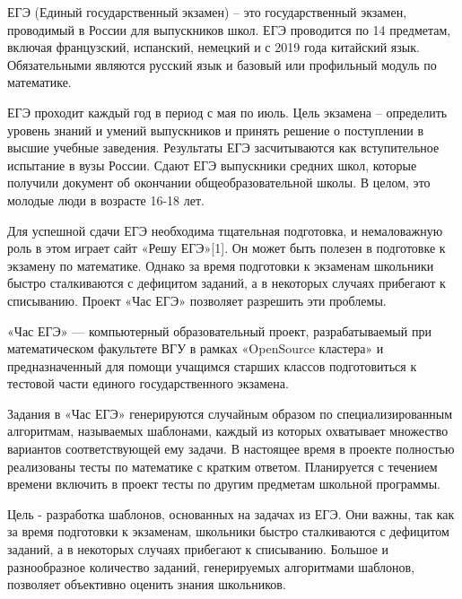 \quad ЕГЭ (Единый государственный экзамен) – это государственный экзамен, проводимый в России для выпускников школ. ЕГЭ проводится по 14 предметам, включая французский, испанский, немецкий и с 2019 года китайский язык. Обязательными являются русский язык и базовый или профильный модуль по математике.

\quad ЕГЭ проходит каждый год в период с мая по июль. Цель экзамена – определить уровень знаний и умений выпускников и принять решение о поступлении в высшие учебные заведения. Результаты ЕГЭ засчитываются как вступительное испытание в вузы России. Сдают ЕГЭ выпускники средних школ, которые получили документ об окончании общеобразовательной школы. В целом, это молодые люди в возрасте 16-18 лет.

\quad Для успешной сдачи ЕГЭ необходима тщательная подготовка, и немаловажную роль в этом играет сайт «Решу ЕГЭ»[1]. Он может быть полезен в подготовке к экзамену по математике.
Однако за время подготовки к экзаменам школьники быстро сталкиваются с дефицитом заданий, а в некоторых случаях прибегают к списыванию. Проект «Час ЕГЭ» позволяет разрешить эти проблемы. 

\quad «Час ЕГЭ» — компьютерный образовательный проект, разрабатываемый при математическом факультете ВГУ в рамках «OpenSource кластера» и предназначенный для помощи учащимся старших классов подготовиться к тестовой части единого государственного экзамена.

\quad Задания в «Час ЕГЭ» генерируются случайным образом по специализированным алгоритмам, называемых шаблонами, каждый из которых охватывает множество вариантов соответствующей ему задачи. В настоящее время в проекте полностью реализованы тесты по математике с кратким ответом. Планируется с течением времени включить в проект тесты по другим предметам школьной программы. 

\quad Цель - разработка шаблонов, основанных на задачах из ЕГЭ. Они важны, так как за время подготовки к экзаменам, школьники быстро сталкиваются с дефицитом заданий, а в некоторых случаях прибегают к списыванию. Большое и разнообразное количество заданий, генерируемых алгоритмами шаблонов, позволяет объективно оценить знания школьников.

